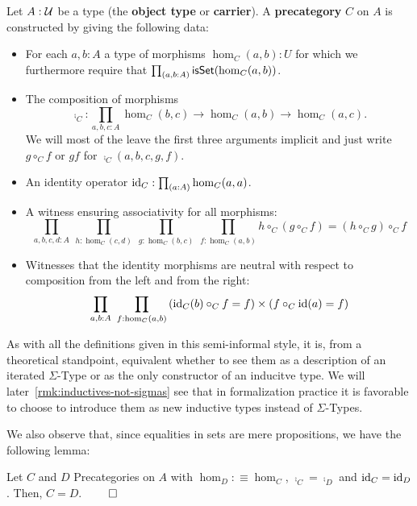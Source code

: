 \begin{defn}[Precategory] \label{def:hott-precat}
Let $A : \mathcal{U}$ be a type (the \textbf{object type} or \textbf{carrier}). A
\textbf{precategory} $C$ on $A$ is constructed by giving the following data:
\begin{itemize}
\item For each $a, b : A$ a type of morphisms $\hom_C(a, b) : U$ for which we furthermore
require that $\prod_{(a,b:A)} \mathsf{isSet}(\hom_C(a, b))$.
\item The composition of morphisms
\begin{equation*}
\comp_C : \prod_{a,b,c:A} \hom_C(b, c) \to \hom_C(a, b) \to \hom_C(a, c) \text{.}
\end{equation*}
We will most of the leave the first three arguments implicit and just write
$g \circ_C f$ or $gf$ for $\comp_C(a,b,c,g,f)$.
\item An identity operator $\operatorname{id}_C : \prod_{(a:A)} \hom_C(a,a)$.
\item A witness ensuring associativity for all morphisms:
\begin{equation*}
\prod_{a,b,c,d:A} ~ \prod_{h:\hom_C(c,d)} ~ \prod_{g:\hom_C(b,c)} ~ \prod_{f:\hom_C(a,b)}
h \circ_C (g \circ_C f) = (h \circ_C g) \circ_C f
\end{equation*}
\item Witnesses that the identity morphisms are neutral with respect to composition
from the left and from the right:
\begin{equation*}
\prod_{a, b : A} ~ \prod_{f : \hom_C(a, b)}
\left(\operatorname{id}_C(b) \circ_C f = f\right) \times \left(f \circ_C \operatorname{id}(a) = f\right)
\end{equation*}
\end{itemize}
\end{defn}

As with all the definitions given in this semi-informal style, it is, from a
theoretical standpoint, equivalent whether to see them as a description of an
iterated $\Sigma$-Type or as the only constructor of an inducitve type.
We will later~\ref{rmk:inductives-not-sigmas} see that in formalization practice
it is favorable to choose to introduce them as new inductive types instead of
$\Sigma$-Types.

We also observe that, since equalities in sets are mere propositions, we have the
following lemma:
\begin{lemma} \label{thm:hott-eq-precat}
Let $C$ and $D$ Precategories on $A$ with $\hom_D :\equiv \hom_C$, 
$\comp_C = \comp_D$ and $\operatorname{id}_C = \operatorname{id}_D$.
Then, $C = D$. \hfill $\qed$
\end{lemma}

